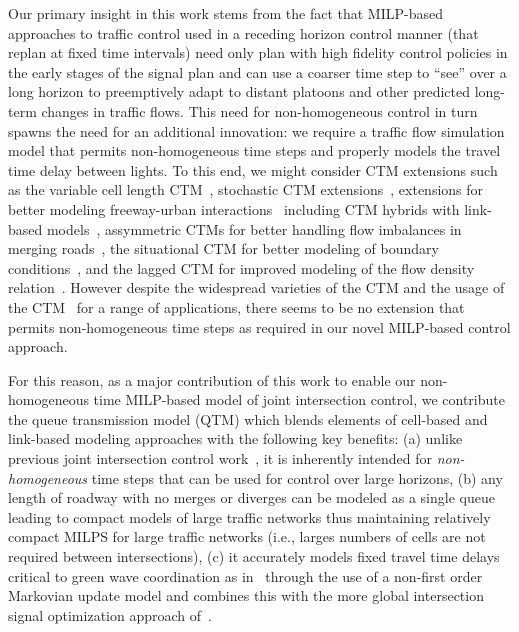 Our primary insight in this work stems from the fact that MILP-based
approaches to traffic control used in a receding horizon control
manner (that replan at fixed time intervals) need only plan with high
fidelity control policies in the early stages of the signal plan and
can use a coarser time step to ``see'' over a long horizon to
preemptively adapt to distant platoons and other predicted long-term
changes in traffic flows.  This need for non-homogeneous control in
turn spawns the need for an additional innovation: we require a
traffic flow simulation model that permits non-homogeneous time steps
and properly models the travel time delay between lights.  To this
end, we might consider CTM extensions such as the variable cell length
CTM~, stochastic CTM
extensions~,
extensions for better modeling freeway-urban
interactions~ including CTM hybrids with
link-based models~, assymmetric CTMs
for better handling flow imbalances in merging
roads~, the situational CTM for better
modeling of boundary conditions~, and the
lagged CTM for improved modeling of the flow density
relation~.  However despite the widespread
varieties of the CTM and the usage of the
CTM~ for a range of applications,
there seems to be no extension that permits non-homogeneous time steps
as required in our novel MILP-based control approach.

For this reason, as a major contribution of this work to enable our
non-homogeneous time MILP-based model of joint intersection control, we
contribute the queue transmission model (QTM) which blends elements of
cell-based and link-based modeling approaches with the following key
benefits: (a) unlike previous joint intersection control work~,
it is inherently intended for \emph{non-homogeneous} time steps that can be used for control over large horizons,
(b) any length of roadway with no merges or diverges can be modeled as
a single queue leading to compact models of large traffic networks thus maintaining relatively
compact MILPS for large traffic networks (i.e., larges numbers of cells are not required between intersections),
(c) it accurately models fixed travel time delays critical to green
wave coordination as
in~
through the use of a non-first order Markovian update model and
combines this with the more global intersection signal optimization
approach of~.

